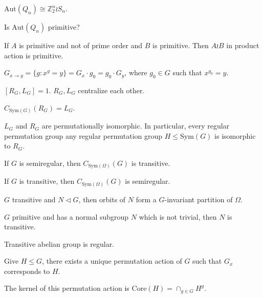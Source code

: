\documentclass[12pt]{article}
\begin{document}
	\begin{ex}
		$\mathrm{Aut}(Q_n) \cong \mathbb{Z}_2^n \wr S_n$.
	\end{ex}
	
	\begin{ex}
		Is $\mathrm{Aut}(Q_n)$ primitive?
	\end{ex}
	
	\begin{ex}
		If $A$ is primitive and not of prime order and $B$ is primitive. Then $A \wr B$ in product action is primitive.
	\end{ex}
	
	\begin{ex}
		$G_{x \to y} = \{g: x^g = y \} = G_x \cdot g_0 = g_0 \cdot G_y$, where $g_0 \in G$ such that $x^{g_0} = y$.
	\end{ex}
	
	\begin{ex}
		$[R_G, L_G] = 1$. $R_G, L_G$ centralize each other.
	\end{ex}
	
	\begin{ex}
		$C_{\mathrm{Sym}(G)}(R_G) = L_G$.
	\end{ex}
	
	\begin{ex}
		$L_G$ and $R_G$ are permutationally isomorphic. In particular, every regular permutation group any regular permutation group $H \leq \mathrm{Sym}(G)$ is isomorphic to $R_G$.
	\end{ex}
	
	\begin{ex}
		If $G$ is semiregular, then $C_{\mathrm{Sym}(\Omega)}(G)$ is transitive.
	\end{ex}
	
	\begin{ex}
		If $G$ is transitive, then $C_{\mathrm{Sym}(\Omega)}(G)$ is semiregular.
	\end{ex}
	
	\begin{ex}
		$G$ transitive and $N \lhd G$, then orbits of $N$ form a $G$-invariant partition of $\Omega$.
	\end{ex}
	
	\begin{ex}
		$G$ primitive and has a normal subgroup $N$ which is not trivial, then $N$ is transitive.
	\end{ex}
	
	\begin{ex}
		Transitive abelian group is regular.
	\end{ex}
	
	\begin{ex}
		Give $H \leq G$, there exists a unique permutation action of $G$ such that $G_x$ corresponds to $H$.
	\end{ex}
	
	\begin{ex}
		The kernel of this permutation action is $\mathrm{Core}(H) = \cap_{g \in G}H^g$.
	\end{ex}
\end{document}
